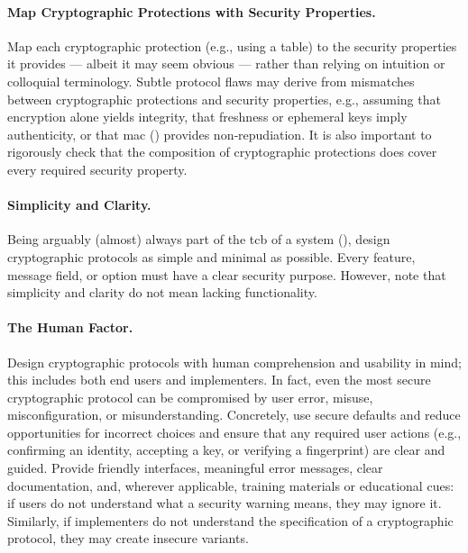 \paragraph*{Map Cryptographic Protections with Security Properties.} Map each cryptographic protection (e.g., using a table) to the security properties it provides --- albeit it may seem obvious --- rather than relying on intuition or colloquial terminology. Subtle protocol flaws may derive from mismatches between cryptographic protections and security properties, e.g., assuming that encryption alone yields integrity, that freshness or ephemeral keys imply authenticity, or that \gls{mac} () provides non‑repudiation. It is also important to rigorously check that the composition of cryptographic protections does cover every required security property.

\paragraph*{Simplicity and Clarity.} Being arguably (almost) always part of the \gls{tcb} of a system (), design cryptographic protocols as simple and minimal as possible. Every feature, message field, or option must have a clear security purpose. However, note that simplicity and clarity do not mean lacking functionality.

\paragraph*{The Human Factor.} Design cryptographic protocols with human comprehension and usability in mind; this includes both end users and implementers. In fact, even the most secure cryptographic protocol can be compromised by user error, misuse, misconfiguration, or misunderstanding. Concretely, use secure defaults and reduce opportunities for incorrect choices and ensure that any required user actions (e.g., confirming an identity, accepting a key, or verifying a fingerprint) are clear and guided. Provide friendly interfaces, meaningful error messages, clear documentation, and, wherever applicable, training materials or educational cues: if users do not understand what a security warning means, they may ignore it. Similarly, if implementers do not understand the specification of a cryptographic protocol, they may create insecure variants.

